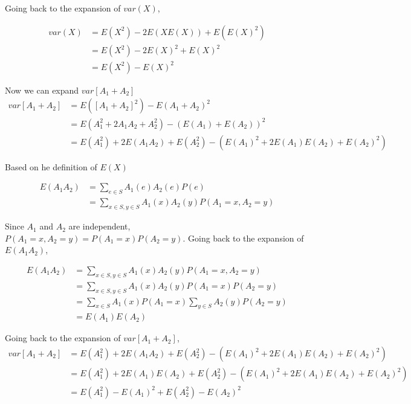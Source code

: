 \begin{enumerate}
Going back to the expansion of $var(X)$, 

\begin{equation*}
\begin{aligned}
var(X) &=  E(X^2) - 2E(XE(X)) + E(E(X)^2)\\
&= E(X^2) - 2E(X)^2 + E(X)^2\\
&= E(X^2) - E(X)^2
\end{aligned}
\end{equation*} 

Now we can expand $var [A_1 + A_2]$
\begin{equation*}
\begin{aligned}
var [A_1 + A_2] &= E([A_1 + A_2]^2) - E(A_1 + A_2)^2\\
&= E(A_1^2 + 2A_1A_2 + A_2^2) - (E(A_1) + E(A_2))^2\\
&= E(A_1^2) + 2E(A_1A_2) + E(A_2^2) - (E(A_1)^2 + 2E(A_1)E(A_2) + E(A_2)^2)
\end{aligned}
\end{equation*} 

Based on he definition of $E(X)$

 \begin{equation*}
\begin{aligned}
E(A_1A_2) &= \sum_{e \in S} A_1(e) A_2(e) P(e) \\
&= \sum_{x \in S, y \in S} A_1(x) A_2(y) P(A_1=x, A_2=y) 
\end{aligned}
\end{equation*} 

Since $A_1$ and $A_2$ are independent, $P(A_1=x, A_2=y) = P(A_1=x)P(A_2=y)$. Going back to the expansion of $E(A_1A_2)$,

 \begin{equation*}
\begin{aligned}
E(A_1A_2) &=  \sum_{x \in S, y \in S} A_1(x) A_2(y) P(A_1=x, A_2=y)\\
&= \sum_{x \in S, y \in S} A_1(x) A_2(y) P(A_1=x) P(A_2=y)\\
&= \sum_{x \in S} A_1(x) P(A_1=x) \sum_{y \in S} A_2(y) P(A_2=y)\\
&= E(A_1) E(A_2)
\end{aligned}
\end{equation*} 


Going back to the expansion of $var[A_1 + A_2]$,
\begin{equation*}
\begin{aligned}
var [A_1 + A_2] &= E(A_1^2) + 2E(A_1A_2) + E(A_2^2) - (E(A_1)^2 + 2E(A_1)E(A_2) + E(A_2)^2)\\
&= E(A_1^2) + 2E(A_1) E(A_2) + E(A_2^2) - (E(A_1)^2 + 2E(A_1)E(A_2) + E(A_2)^2)\\
&= E(A_1^2) - E(A_1)^2 + E(A_2^2) - E(A_2)^2
\end{aligned}
\end{equation*} 


\end{enumerate}
